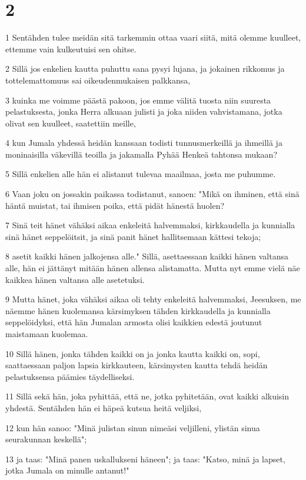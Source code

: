 \chapter{2}

\par 1 Sentähden tulee meidän sitä tarkemmin ottaa vaari siitä, mitä olemme kuulleet, ettemme vain kulkeutuisi sen ohitse.
\par 2 Sillä jos enkelien kautta puhuttu sana pysyi lujana, ja jokainen rikkomus ja tottelemattomuus sai oikeudenmukaisen palkkansa,
\par 3 kuinka me voimme päästä pakoon, jos emme välitä tuosta niin suuresta pelastuksesta, jonka Herra alkuaan julisti ja joka niiden vahvistamana, jotka olivat sen kuulleet, saatettiin meille,
\par 4 kun Jumala yhdessä heidän kanssaan todisti tunnusmerkeillä ja ihmeillä ja moninaisilla väkevillä teoilla ja jakamalla Pyhää Henkeä tahtonsa mukaan?
\par 5 Sillä enkelien alle hän ei alistanut tulevaa maailmaa, josta me puhumme.
\par 6 Vaan joku on jossakin paikassa todistanut, sanoen: "Mikä on ihminen, että sinä häntä muistat, tai ihmisen poika, että pidät hänestä huolen?
\par 7 Sinä teit hänet vähäksi aikaa enkeleitä halvemmaksi, kirkkaudella ja kunnialla sinä hänet seppelöitsit, ja sinä panit hänet hallitsemaan kättesi tekoja;
\par 8 asetit kaikki hänen jalkojensa alle." Sillä, asettaessaan kaikki hänen valtansa alle, hän ei jättänyt mitään hänen allensa alistamatta. Mutta nyt emme vielä näe kaikkea hänen valtansa alle asetetuksi.
\par 9 Mutta hänet, joka vähäksi aikaa oli tehty enkeleitä halvemmaksi, Jeesuksen, me näemme hänen kuolemansa kärsimyksen tähden kirkkaudella ja kunnialla seppelöidyksi, että hän Jumalan armosta olisi kaikkien edestä joutunut maistamaan kuolemaa.
\par 10 Sillä hänen, jonka tähden kaikki on ja jonka kautta kaikki on, sopi, saattaessaan paljon lapsia kirkkauteen, kärsimysten kautta tehdä heidän pelastuksensa päämies täydelliseksi.
\par 11 Sillä sekä hän, joka pyhittää, että ne, jotka pyhitetään, ovat kaikki alkuisin yhdestä. Sentähden hän ei häpeä kutsua heitä veljiksi,
\par 12 kun hän sanoo: "Minä julistan sinun nimeäsi veljilleni, ylistän sinua seurakunnan keskellä";
\par 13 ja taas: "Minä panen uskallukseni häneen"; ja taas: "Katso, minä ja lapset, jotka Jumala on minulle antanut!"
